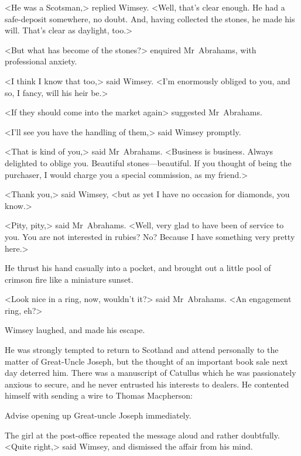 <He was a Scotsman,> replied Wimsey. <Well, that's clear enough. He had a safe-deposit somewhere, no doubt. And, having collected the stones, he made his will. That's clear as daylight, too.>

<But what has become of the stones?> enquired Mr~Abrahams, with professional anxiety.

<I think I know that too,> said Wimsey. <I'm enormously obliged to you, and so, I fancy, will his heir be.>

<If they should come into the market again\longdash> suggested Mr~Abrahams.

<I'll see you have the handling of them,> said Wimsey promptly.

<That is kind of you,> said Mr~Abrahams. <Business is business. Always delighted to oblige you. Beautiful stones—beautiful. If you thought of being the purchaser, I would charge you a special commission, as my friend.>

<Thank you,> said Wimsey, <but as yet I have no occasion for diamonds, you know.>

<Pity, pity,> said Mr~Abrahams. <Well, very glad to have been of service to you. You are not interested in rubies? No? Because I have something very pretty here.>

He thrust his hand casually into a pocket, and brought out a little pool of crimson fire like a miniature sunset.

<Look nice in a ring, now, wouldn't it?> said Mr~Abrahams. <An engagement ring, eh?>

Wimsey laughed, and made his escape.

He was strongly tempted to return to Scotland and attend personally to the matter of Great-Uncle Joseph, but the thought of an important book sale next day deterred him. There was a manuscript of Catullus which he was passionately anxious to secure, and he never entrusted his interests to dealers. He contented himself with sending a wire to Thomas Macpherson:

\begin{telegram}
	Advise opening up Great-uncle Joseph immediately.
\end{telegram}

The girl at the post-office repeated the message aloud and rather doubtfully. <Quite right,> said Wimsey, and dismissed the affair from his mind.

